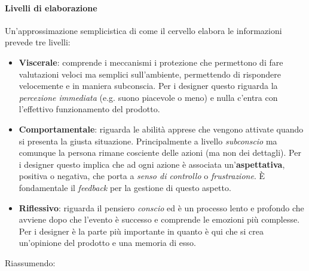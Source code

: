 \paragraph{Livelli di elaborazione} Un'approssimazione semplicistica di come il cervello elabora le informazioni prevede tre livelli:
\begin{itemize}
	\item \textbf{Viscerale}: comprende i meccanismi i protezione che permettono di fare valutazioni veloci ma semplici sull'ambiente, permettendo di rispondere velocemente e in maniera subconscia. Per i designer questo riguarda la \textit{percezione immediata} (e.g. suono piacevole o meno) e nulla c'entra con l'effettivo funzionamento del prodotto.
	\item \textbf{Comportamentale}: riguarda le abilità apprese che vengono attivate quando si presenta la giusta situazione. Principalmente a livello \textit{subconscio} ma comunque la persona rimane cosciente delle azioni (ma non dei dettagli). Per i designer questo implica che ad ogni azione è associata un'\textbf{aspettativa}, positiva o negativa, che porta a \textit{senso di controllo} o \textit{frustrazione}. È fondamentale il \textit{feedback} per la gestione di questo aspetto.
	\item \textbf{Riflessivo}: riguarda il pensiero \textit{conscio} ed è un processo lento e profondo che avviene dopo che l'evento è successo e comprende le emozioni più complesse. Per i designer è la parte più importante in quanto è qui che si crea un'opinione del prodotto e una memoria di esso.
\end{itemize}
Riassumendo:\\
